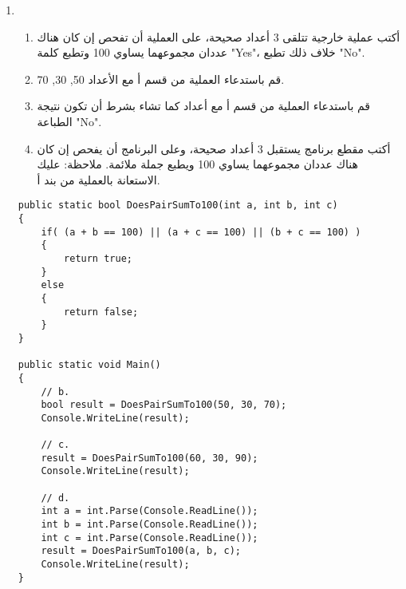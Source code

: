 ﻿\documentclass[12pt]{article}
\begin{document}
\begin{enumerate}[itemsep=3em]
\begin{enumerate}
\item
\begin{enumerate}
    \item أكتب عملية خارجية تتلقى 3 أعداد صحيحة، على العملية أن تفحص إن كان هناك عددان مجموعهما يساوي 100 وتطبع كلمة \textenglish{"Yes"}، خلاف ذلك تطبع \textenglish{"No"}.
    \item قم باستدعاء العملية من قسم أ مع الأعداد \textenglish{50, 30, 70}.
    \item قم باستدعاء العملية من قسم أ مع أعداد كما تشاء بشرط أن تكون نتيجة الطباعة \textenglish{"No"}.
    \item أكتب مقطع برنامج يستقبل 3 أعداد صحيحة، وعلى البرنامج أن يفحص إن كان هناك عددان مجموعهما يساوي 100 ويطبع جملة ملائمة. ملاحظة: عليك الاستعانة بالعملية من بند أ.
\end{enumerate}

\ifwithsols
\begin{boxSolution}
\begin{english}
\begin{verbatim}
public static bool DoesPairSumTo100(int a, int b, int c)
{
    if( (a + b == 100) || (a + c == 100) || (b + c == 100) )
    {
        return true;
    }
    else
    {
        return false;
    }
}

public static void Main()
{
    // b.
    bool result = DoesPairSumTo100(50, 30, 70);
    Console.WriteLine(result);

    // c.
    result = DoesPairSumTo100(60, 30, 90);
    Console.WriteLine(result);

    // d.
    int a = int.Parse(Console.ReadLine());
    int b = int.Parse(Console.ReadLine());
    int c = int.Parse(Console.ReadLine());
    result = DoesPairSumTo100(a, b, c);
    Console.WriteLine(result);
}
\end{verbatim}
\end{english}
\end{boxSolution}
\clearpage
\fi


\end{enumerate}
\end{enumerate}
\end{document}
